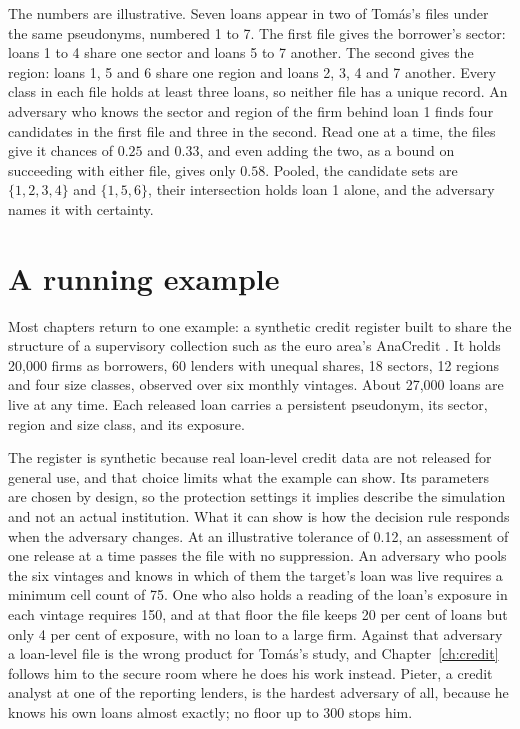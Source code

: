 \begin{example}\label{c1:ex-twotables}
The numbers are illustrative. Seven loans appear in two of Tom\'as's files under the same pseudonyms, numbered 1 to 7. The first file gives the borrower's sector: loans 1 to 4 share one sector and loans 5 to 7 another. The second gives the region: loans 1, 5 and 6 share one region and loans 2, 3, 4 and 7 another. Every class in each file holds at least three loans, so neither file has a unique record. An adversary who knows the sector and region of the firm behind loan 1 finds four candidates in the first file and three in the second. Read one at a time, the files give it chances of $0.25$ and $0.33$, and even adding the two, as a bound on succeeding with either file, gives only $0.58$. Pooled, the candidate sets are $\{1,2,3,4\}$ and $\{1,5,6\}$, their intersection holds loan 1 alone, and the adversary names it with certainty.
\end{example}

\section{A running example}

Most chapters return to one example: a synthetic credit register built to share the
structure of a supervisory collection such as the euro area's AnaCredit
\citep{israel2017}. It holds 20,000 firms as borrowers, 60 lenders with unequal shares, 18
sectors, 12 regions and four size classes, observed over six monthly vintages. About 27,000
loans are live at any time. Each released loan carries a persistent pseudonym, its sector,
region and size class, and its exposure.

The register is synthetic because real loan-level credit data are not released for general
use, and that choice limits what the example can show. Its parameters are chosen by design,
so the protection settings it implies describe the simulation and not an actual institution.
What it can show is how the decision rule responds when the adversary changes. At an
illustrative tolerance of 0.12, an assessment of one release at a time passes the file with
no suppression. An adversary who pools the six vintages and knows in which of them the
target's loan was live requires a minimum cell count of 75. One who also holds a reading of
the loan's exposure in each vintage requires 150, and at that floor the file keeps 20 per
cent of loans but only 4 per cent of exposure, with no loan to a large firm.
Against that adversary a loan-level file is the wrong product for Tomás's study, and
Chapter~\ref{ch:credit} follows him to the secure room where he does his work instead. Pieter,
a credit analyst at one of the reporting lenders, is the hardest adversary of all, because
he knows his own loans almost exactly; no floor up to 300 stops him.

